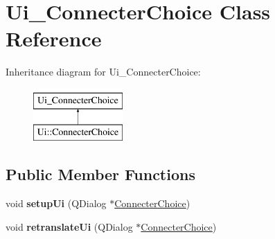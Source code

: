 \hypertarget{class_ui___connecter_choice}{\section{Ui\-\_\-\-Connecter\-Choice Class Reference}
\label{class_ui___connecter_choice}
}
Inheritance diagram for Ui\-\_\-\-Connecter\-Choice\-:\begin{figure}[H]
\begin{center}
\leavevmode
\includegraphics[height=2.000000cm]{class_ui___connecter_choice}
\end{center}
\end{figure}
\subsection*{Public Member Functions}
\begin{DoxyCompactItemize}
\item 
\hypertarget{class_ui___connecter_choice_a9b44f7732f2ac1c2275a69e56b8d156d}{void {\bfseries setup\-Ui} (Q\-Dialog $\ast$\hyperlink{class_connecter_choice}{Connecter\-Choice})}\label{class_ui___connecter_choice_a9b44f7732f2ac1c2275a69e56b8d156d}

\item 
\hypertarget{class_ui___connecter_choice_ade7adf372c37d601e37861a65aec8ebe}{void {\bfseries retranslate\-Ui} (Q\-Dialog $\ast$\hyperlink{class_connecter_choice}{Connecter\-Choice})}\label{class_ui___connecter_choice_ade7adf372c37d601e37861a65aec8ebe}

\end{DoxyCompactItemize}
